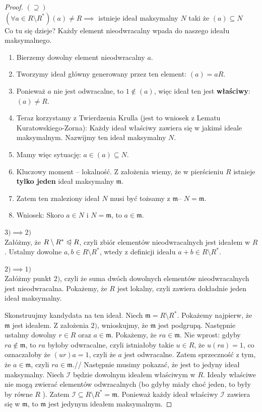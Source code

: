 \begin{proof}
	$\left( \supseteq  \right) $ \\
	$\left(\forall a\in R\setminus R^{\ast}  \right) \left( a \right) \neq R \implies $ istnieje ideał maksymalny $N$ taki że $\left( a \right) \subseteq N$\\
	Co tu się dzieje? Każdy element nieodwracalny wpada do naszego ideału maksymalnego.
	\begin{enumerate}[label=\arabic*)]
		\item Bierzemy dowolny element nieodwracalny $a$.
		\item Tworzymy ideał główny generowany przez ten element: $\left( a \right) = aR$.
		\item Ponieważ $a$ nie jest odwracalne, to $1 \not\in \left( a \right) $, więc ideał ten jest \textbf{właściwy}: $\left( a \right) \neq  R$.
		\item Teraz korzystamy z Twierdzenia Krulla (jest to wniosek z Lematu Kuratowskiego-Zorna): Każdy ideał właściwy zawiera się w jakimś ideale maksymalnym. Nazwijmy ten ideał maksymalny $N$.
		\item Mamy więc sytuację: $a \in \left( a \right) \subseteq N$.
		\item Kluczowy moment -- lokalność. Z założenia wiemy, że w pierścieniu $R$ istnieje \textbf{tylko jeden} ideał maksymalny $\mathfrak{m}$.
		\item Zatem ten znaleziony ideał $N$ musi być tożsamy z $\mathfrak{m}$--  $N= \mathfrak{m}$.
		\item Wniosek: Skoro $a \in N$ i $N = \mathfrak{m}$, to  $a \in \mathfrak{m}$.
	\end{enumerate}
	\noindent $3) \implies 2) $\\
	Załóżmy, że $R\setminus R^{\ast} \trianglelefteqslant R$, czyli zbiór elementów nieodwracalnych jest ideałem w $R$. Ustalmy dowolne  $a,b \in R\setminus R^{\ast} $, wtedy z definicji ideału $a + b \in R\setminus R^{\ast} $.

	\noindent $2) \implies 1)$\\
	Załóżmy punkt $2)$, czyli że suma dwóch dowolnych elementów nieodwracalnych jest nieodwracalna. Pokażemy, że $R$ jest lokalny, czyli zawiera dokładnie jeden ideał maksymalny. 

	Skonstruujmy kandydata na ten ideał. Niech $\mathfrak{m} = R\setminus R^{\ast} $. Pokażemy najpierw, że $\mathfrak{m} $ jest ideałem. Z założenia $2)$, wnioskujmy, że $\mathfrak{m} $ jest podgrupą. Następnie ustalmy dowolny $r \in R$ oraz $a \in \mathfrak{m} $. Pokażemy, że $ra \in \mathfrak{m}$. Nie wprost: gdyby $ra \not\in \mathfrak{m} $, to $ra$ byłoby odwracalne, czyli istniałoby takie $u \in R$, że $u(ra) = 1$, co oznaczałoby że $\left( ur \right) a = 1$, czyli że $a$ jest odwracalne. Zatem sprzeczność z tym, że $a\in \mathfrak{m} $, czyli $ra \in \mathfrak{m} $.//
	Następnie musimy pokazać, że jest to jedyny ideał maksymalny. Niech $\mathcal{I}$ będzie dowolnym ideałem właściwym w $R$. Ideały właściwe nie mogą zwierać elementów odwracalnych (bo gdyby miały choć jeden, to były by równe $R$ ). Zatem $\mathcal{I}\subseteq R\setminus R^{\ast} = \mathfrak{m} $. Ponieważ każdy ideał właściwy  $\mathcal{I}$ zawiera się w $\mathfrak{m} $, to $\mathfrak{m} $ jest jedynym ideałem maksymalnym.
\end{proof} 
